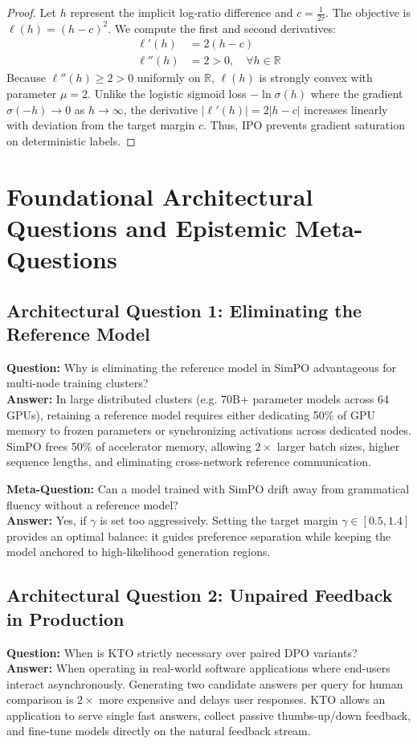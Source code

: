 \documentclass[11pt,a4paper]{article}
\theoremstyle{definition}
\begin{document}
\begin{proof}
Let $h$ represent the implicit log-ratio difference and $c = \frac{1}{2\tau}$.
The objective is $\ell(h) = (h - c)^2$.
We compute the first and second derivatives:
{\boldmath
\begin{align}
\ell'(h) &= 2(h - c) \\
\ell''(h) &= 2 > 0, \quad \forall h \in \mathbb{R}
\end{align}
}
Because $\ell''(h) \ge 2 > 0$ uniformly on $\mathbb{R}$, $\ell(h)$ is strongly convex with parameter $\mu = 2$.
Unlike the logistic sigmoid loss $-\ln \sigma(h)$ where the gradient $\sigma(-h) \to 0$ as $h \to \infty$, the derivative $|\ell'(h)| = 2|h - c|$ increases linearly with deviation from the target margin $c$.
Thus, IPO prevents gradient saturation on deterministic labels.
\end{proof}

\section{Foundational Architectural Questions and Epistemic Meta-Questions}

\subsection{Architectural Question 1: Eliminating the Reference Model}
\textbf{Question:} Why is eliminating the reference model in SimPO advantageous for multi-node training clusters?\\
\textbf{Answer:} In large distributed clusters (e.g. 70B+ parameter models across 64 GPUs), retaining a reference model requires either dedicating 50\% of GPU memory to frozen parameters or synchronizing activations across dedicated nodes. SimPO frees 50\% of accelerator memory, allowing $2\times$ larger batch sizes, higher sequence lengths, and eliminating cross-network reference communication.

\textbf{Meta-Question:} Can a model trained with SimPO drift away from grammatical fluency without a reference model?\\
\textbf{Answer:} Yes, if $\gamma$ is set too aggressively. Setting the target margin $\gamma \in [0.5, 1.4]$ provides an optimal balance: it guides preference separation while keeping the model anchored to high-likelihood generation regions.

\subsection{Architectural Question 2: Unpaired Feedback in Production}
\textbf{Question:} When is KTO strictly necessary over paired DPO variants?\\
\textbf{Answer:} When operating in real-world software applications where end-users interact asynchronously. Generating two candidate answers per query for human comparison is $2\times$ more expensive and delays user responses. KTO allows an application to serve single fast answers, collect passive thumbs-up/down feedback, and fine-tune models directly on the natural feedback stream.
\end{document}
